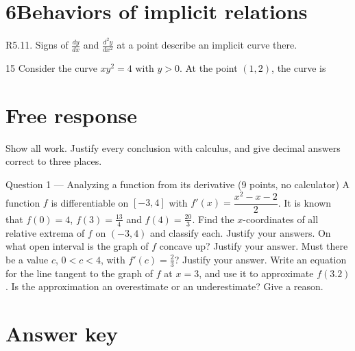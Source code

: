 \documentclass{apcalc}
\begin{document}
\section*{6\quad Behaviors of implicit relations}
\begin{setrule}R5.11. Signs of $\frac{dy}{dx}$ and $\frac{d^2y}{dx^2}$ at a point describe an implicit curve there.\end{setrule}
\begin{q}{15}
Consider the curve $xy^2=4$ with $y>0$. At the point $(1,2)$, the curve is
\end{q}
\clearpage\section*{Free response}
Show all work. Justify every conclusion with calculus, and give decimal answers correct to three places.
\begin{frq}{Question 1 --- Analyzing a function from its derivative (9 points, no calculator)}
A function $f$ is differentiable on $[-3,4]$ with $f'(x)=\dfrac{x^2-x-2}{2}$. It is known that $f(0)=4$, $f(3)=\frac{13}{4}$ and $f(4)=\frac{20}{3}$.
Find the $x$-coordinates of all relative extrema of $f$ on $(-3,4)$ and classify each. Justify your answers.\workspace{1.6in}
On what open interval is the graph of $f$ concave up? Justify your answer.\workspace{1.6in}
Must there be a value $c$, $0<c<4$, with $f'(c)=\frac23$? Justify your answer.\workspace{1.6in}
Write an equation for the line tangent to the graph of $f$ at $x=3$, and use it to approximate $f(3.2)$. Is the approximation an overestimate or an underestimate? Give a reason.\workspace{1.6in}
\end{frq}
\clearpage\section*{Answer key}
\vspace{4pt}
\end{document}

